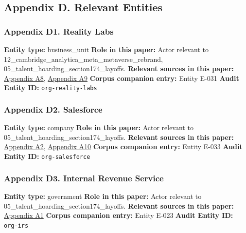 \documentclass[
  american,
  11pt,
  letterpaper,
]{article}
\begin{document}
\subsection{Appendix D. Relevant
Entities}\label{appendix-d.-relevant-entities}

\subsubsection{Appendix D1. Reality
Labs}\label{appendix-d1-reality-labs}

\textbf{Entity type:} business\_unit \textbf{Role in this paper:} Actor
relevant to 12\_cambridge\_analytica\_meta\_metaverse\_rebrand,
05\_talent\_hoarding\_section174\_layoffs. \textbf{Relevant sources in
this paper:}
\hyperref[appendix-a8-meta-posts-lower-q4-profit-announces-huge-stock-buyback]{Appendix
A8},
\hyperref[appendix-a9-meta-posts-sharp-profit-revenue-increase-in-q4-thanks-to-cost-cuts-and-advertising-rebound]{Appendix
A9} \textbf{Corpus companion entry:} Entity E-031 \textbf{Audit Entity
ID:} \texttt{org-reality-labs}

\subsubsection{Appendix D2. Salesforce}\label{appendix-d2-salesforce}

\textbf{Entity type:} company \textbf{Role in this paper:} Actor
relevant to 05\_talent\_hoarding\_section174\_layoffs. \textbf{Relevant
sources in this paper:}
\hyperref[appendix-a2-amazon-salesforce-jettison-jobs-in-latest-tech-worker-purge]{Appendix
A2},
\hyperref[appendix-a10-big-tech-layoffs-shattered-industry-worker-confidence]{Appendix
A10} \textbf{Corpus companion entry:} Entity E-033 \textbf{Audit Entity
ID:} \texttt{org-salesforce}

\subsubsection{Appendix D3. Internal Revenue
Service}\label{appendix-d3-internal-revenue-service}

\textbf{Entity type:} government \textbf{Role in this paper:} Actor
relevant to 05\_talent\_hoarding\_section174\_layoffs. \textbf{Relevant
sources in this paper:}
\hyperref[appendix-a1-notice-2023-63-guidance-on-section-174-and-specified-research-or-experimental-expenditures]{Appendix
A1} \textbf{Corpus companion entry:} Entity E-023 \textbf{Audit Entity
ID:} \texttt{org-irs}
\end{document}
